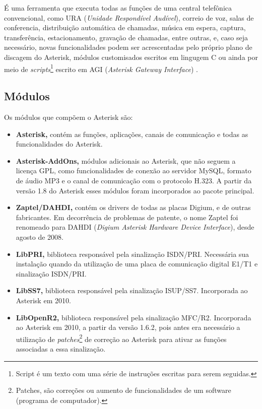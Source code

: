 É uma ferramenta que executa todas as funções de uma central telefônica convencional, como URA (\textit{Unidade Respondível Audível}), correio de voz, salas de conferencia, distribuição automática de chamadas, música em espera, captura, transferência, estacionamento, gravação de chamadas, entre outras, e, caso seja necessário, novas funcionalidades podem ser acrescentadas pelo próprio plano de discagem do Asterisk, módulos customisados escritos em lingugem C ou ainda por meio de \textit{scripts}\footnote{Script é um texto com uma série de instruções escritas para serem seguidas.} escrito em AGI (\textit{Asterisk Gateway Interface}) \cite{alexandrekeller2014}.

\subsection{Módulos}
Os módulos que compõem o Asterisk são: \cite{books/daglib/0018909}

\begin{itemize}
  \item \textbf{Asterisk,} contém as funções, aplicações, canais de comunicação e todas as funcionalidades do Asterisk.
  \item \textbf{Asterisk-AddOns,} módulos adicionais ao Asterisk, que não seguem a licença GPL, como funcionalidades de conexão ao servidor MySQL, formato de áudio MP3 e o canal de comunicação com o protocolo H.323. A partir da versão 1.8 do Asterisk esses módulos foram incorporados ao pacote principal.
  \item \textbf{Zaptel/DAHDI,} contém os drivers de todas as placas Digium, e de outras fabricantes. Em decorrência de problemas de patente, o nome Zaptel foi renomeado para DAHDI (\textit{Digium Asterisk Hardware Device Interface}), desde agosto de 2008.
  \item \textbf{LibPRI,} biblioteca responsável pela sinalização ISDN/PRI. Necessária sua instalação quando da utilização de uma placa de comunicação digital E1/T1 e sinalização ISDN/PRI.
  \item \textbf{LibSS7,} biblioteca responsável pela sinalização ISUP/SS7. Incorporada ao Asterisk em 2010.
  \item \textbf{LibOpenR2,} biblioteca responsável pela sinalização MFC/R2. Incorporada ao Asterisk em 2010, a partir da versão 1.6.2, pois antes era necessário a utilização de \textit{patches}\footnote{Patches, são correções ou aumento de funcionalidades de um software (programa de computador).} de correção ao Asterisk para ativar as funções associadas a essa sinalização.
\end{itemize}

